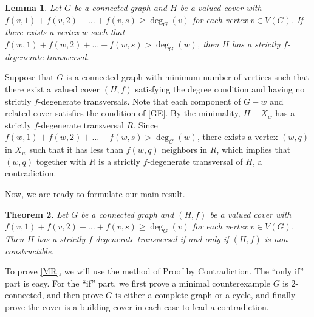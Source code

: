 \documentclass{article}
\makeatletter
\renewenvironment{proof}[1][\proofname]{\par
  \pushQED{\qed}%
  \normalfont \topsep6\p@\@plus6\p@\relax
  \trivlist
  \item[\hskip\labelsep
        \bfseries
    #1\@addpunct{.}]\ignorespaces
}{%
  \popQED\endtrivlist\@endpefalse
}
\newtheorem{theorem}{Theorem}[section]
\newtheorem{lemma}[theorem]{Lemma}
\theoremstyle{definition}
\makeatother
\begin{document}
\begin{lemma}\label{GE}
Let $G$ be a connected graph and $H$ be a valued cover with $f(v, 1) + f(v, 2) + \dots + f(v, s) \geq \deg_{G}(v)$ for each vertex $v \in V(G)$. If there exists a vertex $w$ such that $f(w, 1) + f(w, 2) + \dots + f(w, s) > \deg_{G}(w)$, then $H$ has a strictly $f$-degenerate transversal.  
\end{lemma}
\begin{proof}
Suppose that $G$ is a connected graph with minimum number of vertices such that there exist a valued cover $(H, f)$ satisfying the degree condition and having no strictly $f$-degenerate transversals. Note that each component of $G - w$ and related cover satisfies the condition of \autoref{GE}. By the minimality, $H - X_{w}$ has a strictly $f$-degenerate transversal $R$. Since $f(w, 1) + f(w, 2) + \dots + f(w, s) > \deg_{G}(w)$, there exists a vertex $(w, q)$ in $X_{w}$ such that it has less than $f(w, q)$ neighbors in $R$, which implies that $(w, q)$ together with $R$ is a strictly $f$-degenerate transversal of $H$, a contradiction. 
\end{proof}

Now, we are ready to formulate our main result. 
\begin{theorem}\label{MR}
Let $G$ be a connected graph and $(H, f)$ be a valued cover with $f(v, 1) + f(v, 2) + \dots + f(v, s) \geq \deg_{G}(v)$ for each vertex $v \in V(G)$. Then $H$ has a strictly $f$-degenerate transversal if and only if $(H, f)$ is non-constructible. 
\end{theorem}

To prove \autoref{MR}, we will use the method of Proof by Contradiction. The ``only if'' part is easy. For the ``if'' part, we first prove a minimal counterexample $G$ is $2$-connected, and then prove $G$ is either a complete graph or a cycle, and finally prove the cover is a building cover in each case to lead a contradiction. 
\end{document}
